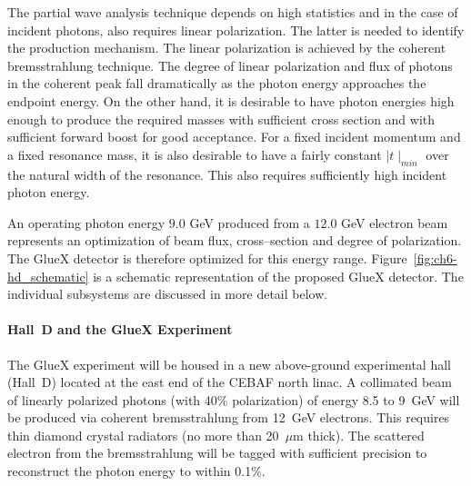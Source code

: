 \hspace{1cm}
The partial wave analysis technique  depends on high statistics and
in the case of incident photons, also requires linear polarization.
The latter is needed to identify the production mechanism. The linear 
polarization is achieved by the coherent bremsstrahlung technique.  
The degree of linear polarization and flux of photons in the coherent 
peak fall dramatically as the photon energy approaches
the endpoint energy.  On the other hand, it is desirable to have
photon energies high enough to produce the required masses with
sufficient cross section and with sufficient forward boost for good
acceptance. For a fixed incident momentum and a fixed resonance
mass, it is also desirable to have a fairly constant $\mid t\mid_{min}$ over
the natural width of the resonance.  This also requires sufficiently
high incident photon energy. 

\hspace{1cm}
An operating photon energy $9.0$ GeV produced from a $12.0$ GeV 
electron beam represents an optimization of beam flux, cross--section and 
degree of polarization.  The GlueX detector is therefore optimized for 
this energy range. Figure~\ref{fig:ch6-hd_schematic} is a schematic 
representation of the proposed GlueX detector. The individual 
subsystems are discussed in more detail below.


\paragraph{Hall~D and the GlueX Experiment}

The GlueX experiment will be housed in a new above-ground experimental hall
(Hall~D) located at the east end of the CEBAF north linac. A collimated beam 
of linearly polarized photons (with 40\% polarization) of energy 8.5 to 9~GeV 
will be produced via coherent bremsstrahlung from 12~GeV electrons. This 
requires thin diamond  crystal radiators (no more than 20~$\mu$m thick). 
The scattered electron from the bremsstrahlung will be tagged with sufficient 
precision to reconstruct the photon energy to within 0.1\%.


